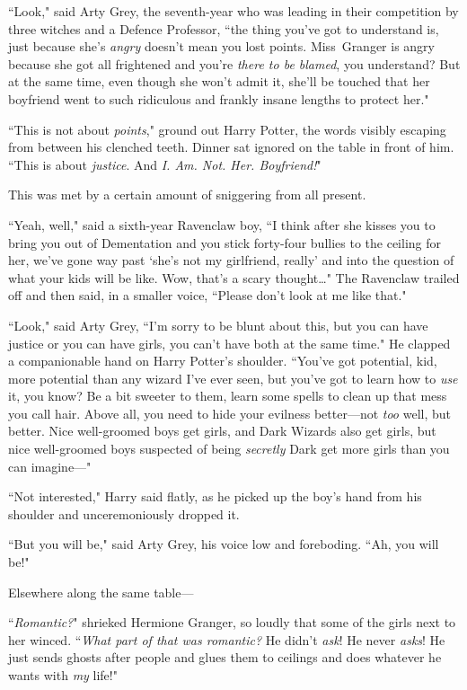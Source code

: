 ``Look," said Arty Grey, the seventh-year who was leading in their competition by three witches and a Defence Professor, ``the thing you've got to understand is, just because she's \emph{angry} doesn't mean you lost points. Miss~Granger is angry because she got all frightened and you're \emph{there to be blamed}, you understand? But at the same time, even though she won't admit it, she'll be touched that her boyfriend went to such ridiculous and frankly insane lengths to protect her."

``This is not about \emph{points}," ground out Harry Potter, the words visibly escaping from between his clenched teeth. Dinner sat ignored on the table in front of him. ``This is about \emph{justice}. And \emph{I\@. Am. Not. Her. Boyfriend!}"

This was met by a certain amount of sniggering from all present.

``Yeah, well," said a sixth-year Ravenclaw boy, ``I think after she kisses you to bring you out of Dementation and you stick forty-four bullies to the ceiling for her, we've gone way past `she's not my girlfriend, really' and into the question of what your kids will be like. Wow, that's a scary thought{\ldots}" The Ravenclaw trailed off and then said, in a smaller voice, ``Please don't look at me like that."

``Look," said Arty Grey, ``I'm sorry to be blunt about this, but you can have justice or you can have girls, you can't have both at the same time." He clapped a companionable hand on Harry Potter's shoulder. ``You've got potential, kid, more potential than any wizard I've ever seen, but you've got to learn how to \emph{use} it, you know? Be a bit sweeter to them, learn some spells to clean up that mess you call hair. Above all, you need to hide your evilness better—not \emph{too} well, but better. Nice well-groomed boys get girls, and Dark Wizards also get girls, but nice well-groomed boys suspected of being \emph{secretly} Dark get more girls than you can imagine—"

``Not interested," Harry said flatly, as he picked up the boy's hand from his shoulder and unceremoniously dropped it.

``But you will be," said Arty Grey, his voice low and foreboding. ``Ah, you will be!"

Elsewhere along the same table—

``\emph{Romantic?}" shrieked Hermione Granger, so loudly that some of the girls next to her winced. ``\emph{What part of that was romantic?} He didn't \emph{ask}! He never \emph{asks}! He just sends ghosts after people and glues them to ceilings and does whatever he wants with \emph{my} life!"

